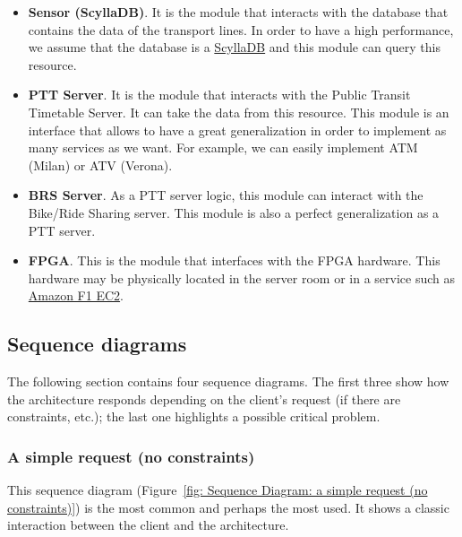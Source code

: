 \documentclass[a4paper]{article}
\begin{document}
\begin{itemize}
        \item \textbf{Sensor (ScyllaDB)}. It is the module that interacts with the database that contains the data of the transport lines. In order to have a high performance, we assume that the database is a \href{https://www.scylladb.com/product/technology/}{ScyllaDB} and this module can query this resource.

        \item \textbf{PTT Server}. It is the module that interacts with the Public Transit Timetable Server. It can take the data from this resource. This module is an interface that allows to have a great generalization in order to implement as many services as we want. For example, we can easily implement ATM (Milan) or ATV (Verona).
        
        \item \textbf{BRS Server}. As a PTT server logic, this module can interact with the Bike/Ride Sharing server. This module is also a perfect generalization as a PTT server.

        \item \textbf{FPGA}. This is the module that interfaces with the FPGA hardware. This hardware may be physically located in the server room or in a service such as \href{https://aws.amazon.com/ec2/instance-types/f1/}{Amazon F1 EC2}.
    \end{itemize}    

    \newpage

    \subsection{Sequence diagrams}

    The following section contains four sequence diagrams. The first three show how the architecture responds depending on the client's request (if there are constraints, etc.); the last one highlights a possible critical problem.

    \subsubsection*{A simple request (no constraints)}

    This sequence diagram (Figure~\ref{fig: Sequence Diagram: a simple request (no constraints)}) is the most common and perhaps the most used. It shows a classic interaction between the client and the architecture.
\end{document}
